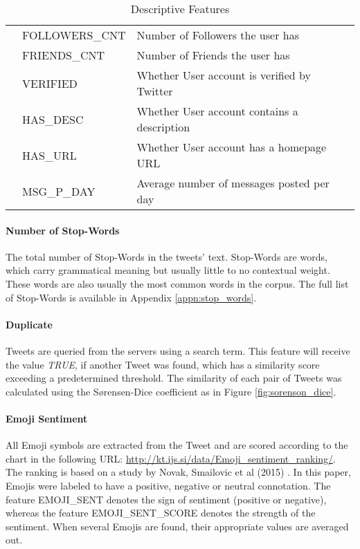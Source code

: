 \begin{table}[h]
\begin{center}
{\begin{tabular}{c |l| l}
							& FOLLOWERS\_CNT 			& Number of Followers the user has	\\
							& FRIENDS\_CNT				& Number of Friends the user has	\\
							& VERIFIED					& Whether User account is verified by Twitter\\
							& HAS\_DESC 				& Whether User account contains a description\\
							& HAS\_URL					& Whether User account has a homepage URL	\\
							& MSG\_P\_DAY 				& Average number of messages posted per day	\\
					\hline\hline
				\end{tabular}
				}	
				\end{center}
				\caption{Descriptive Features}
				\label{table:desc_features}
			\end{table}
		
		
			\paragraph{Number of Stop-Words}
				The total number of Stop-Words in the tweets' text. Stop-Words are words, which carry grammatical meaning but usually little to no contextual weight. These words are also usually the most common words in the corpus. The full list of Stop-Words is available in Appendix \ref{appn:stop_words}.
				
			\paragraph{Duplicate}	
				Tweets are queried from the servers using a search term. This feature will receive the value \textit{TRUE}, if another Tweet was found, which has a similarity score exceeding a predetermined threshold. The similarity of each pair of Tweets was calculated using the S\o rensen-Dice coefficient as in Figure \ref{fig:sorenson_dice}.
			
			\paragraph{Emoji Sentiment}
				All Emoji symbols are extracted from the Tweet and are scored according to the chart in the following URL: \url{http://kt.ijs.si/data/Emoji_sentiment_ranking/}. The ranking is based on a study by Novak, Smailovic et al (2015) \cite{Kralj2015emojis}. In this paper, Emojis were labeled to have a positive, negative or neutral connotation. The feature EMOJI\_SENT denotes the sign of sentiment (positive or negative), whereas the feature EMOJI\_SENT\_SCORE denotes the strength of the sentiment. When several Emojis are found, their appropriate values are averaged out. 
				
